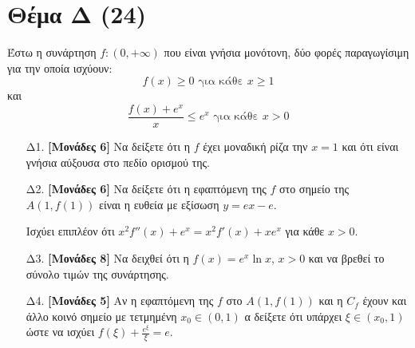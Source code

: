 \documentclass[14pt]{extarticle}
\begin{document}
\section*{Θέμα Δ (24)}
Έστω η συνάρτηση $f:(0,+\infty)$ που είναι γνήσια μονότονη, δύο φορές παραγωγίσιμη για την οποία ισχύουν:
$$f(x)\ge 0 \text{ για κάθε } x\ge 1$$
και
$$\frac{f(x)+e^x}{x}\le e^x \text{ για κάθε } x>0$$
\begin{enumerate}
 \item[Δ1.] \textbf{[Μονάδες 6]} Να δείξετε ότι η $f$ έχει μοναδική ρίζα την $x=1$ και ότι είναι γνήσια αύξουσα στο πεδίο ορισμού της.
 \item[Δ2.] \textbf{[Μονάδες 6]} Να δείξετε ότι η εφαπτόμενη της $f$ στο σημείο της $Α(1,f(1))$ είναι η ευθεία με εξίσωση $y=ex-e$.
       
       Ισχύει επιπλέον ότι $x^2f''(x)+e^x=x^2f'(x)+xe^x$ για κάθε $x>0$.
       
 \item[Δ3.] \textbf{[Μονάδες 8]} Να δειχθεί ότι η $f(x)=e^x\ln x$, $x>0$ και να βρεθεί το σύνολο τιμών της συνάρτησης.
 \item[Δ4.] \textbf{[Μονάδες 5]} Αν η εφαπτόμενη της $f$ στο $Α(1,f(1))$ και η $C_f$ έχουν και άλλο κοινό σημείο με τετμημένη $x_0\in (0,1)$ α δείξετε ότι υπάρχει $ξ\in (x_0,1)$ ώστε να ισχύει $f(ξ)+\frac{e^ξ}{ξ}=e$.
\end{enumerate}
\end{document}
